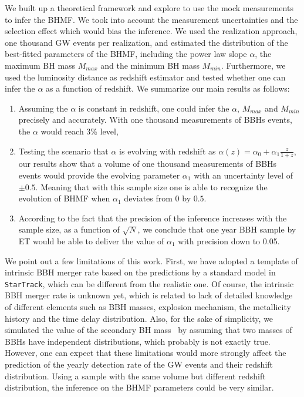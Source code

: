 \documentclass[twocolumn]{aastex62}
\begin{document}
We built up a theoretical framework and explore to use the mock measurements to infer the BHMF. We took into account the measurement uncertainties and the selection effect which would bias the inference. We used the realization approach, one thousand GW events per realization, and estimated the distribution of the best-fitted parameters of the BHMF, including the power law slope $\alpha$, the maximum BH mass $M_{max}$ and the minimum BH mass $M_{min}$. Furthermore, we used the luminosity distance as redshift estimator and tested whether one can infer the $\alpha$ as a function of redshift. We summarize our main results as follows:
\begin{enumerate}
\item Assuming the $\alpha$ is constant in redshift, one could infer the $\alpha$, $M_{max}$ and $M_{min}$ precisely and accurately. With one thousand measurements of BBHs events, the $\alpha$ would reach 3\% level, 
\item Testing the scenario that $\alpha$ is evolving with redshift as $\alpha(z) = \alpha_0 + \alpha_1\frac{z}{1+z}$, our results show that a volume of one thousand measurements of BBHs events would provide the evolving parameter $\alpha_1$ with an uncertainty level of $\pm0.5$. Meaning that with this sample size one is able to recognize the evolution of BHMF when $\alpha_1$ deviates from $0$ by $0.5$.
\item According to the fact that the precision of the inference increases with the sample size, as a function of $\sqrt{N}$, we conclude that one year BBH sample by ET would be able to deliver the value of $\alpha_1$ with precision down to 0.05.
\end{enumerate}

We point out a few limitations of this work. First, we have adopted a template of intrinsic BBH merger rate based on the predictions by a standard model in {\tt StarTrack}, which can be different from the realistic one. Of course, the intrinsic BBH merger rate is unknown yet, which is related to 
lack of detailed knowledge of different elements such as BBH masses, explosion mechanism, the metallicity history and the time delay distribution. Also, for the sake of simplicity, we simulated the value of the secondary BH mass \mtwo\ by assuming that two masses of BBHs have independent distributions, which probably is not exactly true. However, one can expect that these limitations would more strongly affect the prediction of the yearly detection rate of the GW events and their redshift distribution. Using a sample with the same volume but different redshift distribution, the inference on the BHMF parameters could be very similar. 
\end{document}
